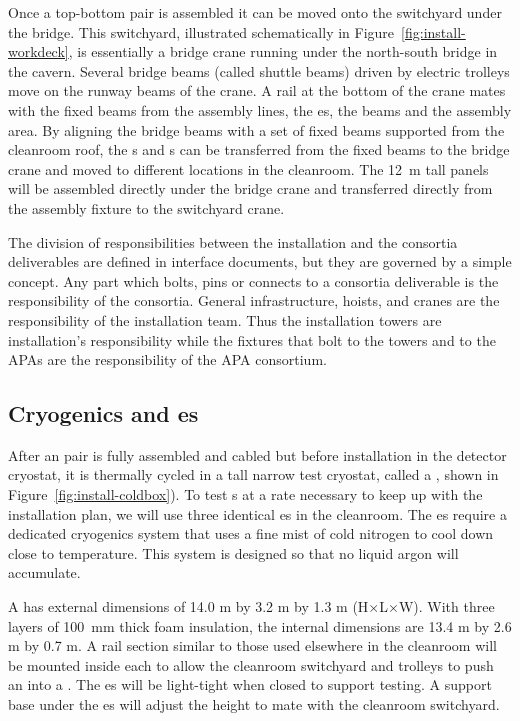 Once a top-bottom  pair is assembled it can be moved onto the switchyard under the bridge. 
This switchyard, illustrated schematically in Figure~\ref{fig:install-workdeck}, is essentially a bridge crane running under the north-south bridge in the cavern.  
Several bridge beams (called shuttle beams) driven by electric trolleys  move on the runway beams of the crane.  
A rail at the bottom of the crane mates with the fixed beams  from the assembly lines, the \coldbox{}es, the  beams and the  assembly area.
By aligning the bridge beams with a set of fixed beams supported from the cleanroom roof, the s and s can be transferred from the fixed beams to the bridge crane and moved to different locations in the cleanroom. 
The \SI{12}{m} tall  panels will be assembled directly under the bridge crane and transferred directly from the assembly fixture to the switchyard crane.

The division of responsibilities between the installation and the consortia deliverables are defined in interface documents, but they are governed by a simple concept. Any part which bolts, pins or connects to a consortia deliverable is the responsibility of the consortia. General infrastructure, hoists, and cranes are the responsibility of the installation team. Thus the installation towers are installation's responsibility while the fixtures that bolt to the towers and to the APAs are the responsibility of the APA consortium. 


\subsection{Cryogenics and \Coldbox{}es}
\label{sec:fdsp-tc-infr-cryo}



After an  pair is fully assembled and cabled but before installation in the detector cryostat, it is thermally cycled in a tall narrow test cryostat, called a \coldbox{}, shown in Figure~\ref{fig:install-coldbox}). 
To test s at a rate necessary to keep up with the installation plan, we will use three identical \coldbox{}es in the cleanroom. 
The \coldbox{}es require a dedicated cryogenics system that uses a fine mist of cold nitrogen to cool down close to  temperature. This system is designed so that no liquid argon will accumulate. 


A \coldbox has external dimensions of 14.0 \si{m} by 3.2 \si{m} by 1.3 \si{m} (H$\times$L$\times$W). With three layers of \SI{100}{mm} thick foam insulation,  
the internal dimensions are 13.4 \si{m} by 2.6 \si{m} by 0.7 \si{m}. A rail section similar to those used elsewhere in the cleanroom will be mounted inside each \coldbox to allow the cleanroom switchyard and trolleys to push an    into a \coldbox. The \coldbox{}es will be light-tight when closed to support  testing. A support base under the \coldbox{}es will adjust the height to mate with the cleanroom switchyard.

